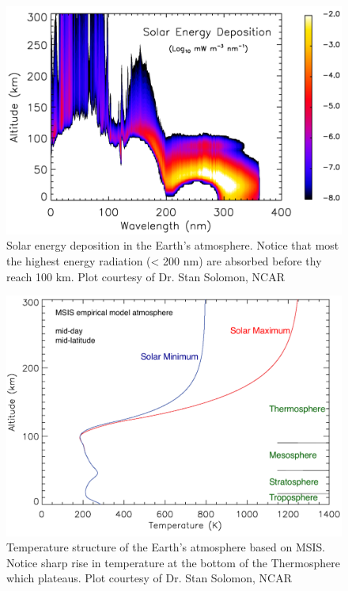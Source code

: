 \begin{figure}[t]
	\centering\includegraphics[width=35pc]{slr_rd_abs.png}
	\caption{Solar energy deposition in the Earth's atmosphere. Notice that most the highest energy radiation (< 200 nm) are absorbed before thy reach 100 km. Plot courtesy of Dr. Stan Solomon, NCAR }
	\label{fig:sl_rad_abs}
\end{figure}
\begin{figure}[t]
	\centering\includegraphics[width=35pc]{okl_temp_stru_slr_min_max.png}
	\caption{Temperature structure of the Earth's atmosphere based on MSIS. Notice sharp rise in temperature at the bottom of the Thermosphere which plateaus. Plot courtesy of Dr. Stan Solomon, NCAR }
	\label{fig:TI_temp_var}
\end{figure}
